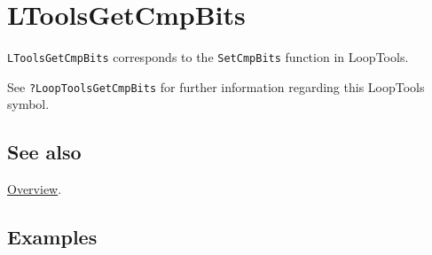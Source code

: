 \documentclass[../FeynHelpersManual.tex]{subfiles}
\begin{document}
\hypertarget{ltoolsgetcmpbits}{
\section{LToolsGetCmpBits}\label{ltoolsgetcmpbits}}

\texttt{LToolsGetCmpBits} corresponds to the \texttt{SetCmpBits}
function in LoopTools.

See \texttt{?LoopTools\textasciigrave GetCmpBits} for further
information regarding this LoopTools symbol.

\subsection{See also}

\hyperlink{toc}{Overview}.

\subsection{Examples}
\end{document}
